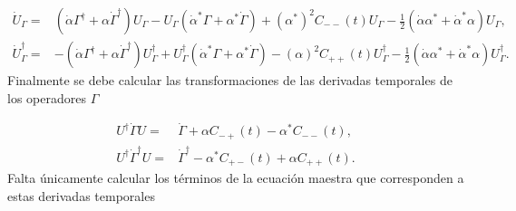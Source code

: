 \documentclass[10pt,a4paper]{report}
\begin{document}
\begin{align}
\dot{U}_\Gamma =&(\dot{\alpha}\Gamma^\dagger +\alpha \dot{\Gamma}^\dagger)U_\Gamma - U_\Gamma(\dot{\alpha}^*\Gamma+\alpha^* \dot{\Gamma}) + (\alpha^*)^2 C_{--}(t)U_\Gamma-\frac{1}{2}(\dot{\alpha} \alpha^*+\dot{\alpha}^* \alpha)U_\Gamma, \\
\dot{U}^\dagger_\Gamma=&-(\dot{\alpha}\Gamma^\dagger +\alpha \dot{\Gamma}^\dagger)U_\Gamma^\dagger + U_\Gamma^\dagger(\dot{\alpha}^*\Gamma+\alpha^* \dot{\Gamma}) - (\alpha)^2 C_{++}(t)U_\Gamma^\dagger-\frac{1}{2}(\dot{\alpha} \alpha^*+\dot{\alpha}^* \alpha)U_\Gamma^\dagger.
\end{align} Finalmente se debe calcular las transformaciones de las derivadas temporales de los operadores $\Gamma$

\begin{align}
U^{\dagger}\dot{\Gamma}U =& \dot{\Gamma} + \alpha C_{-+}(t) -\alpha^* C_{--}(t),\\
U^{\dagger}\dot{\Gamma}^\dagger U =& \dot{\Gamma}^\dagger - \alpha^* C_{+-}(t) +\alpha C_{++}(t). 
\end{align} Falta únicamente calcular los términos de la ecuación maestra que corresponden a estas derivadas temporales








\end{document}

